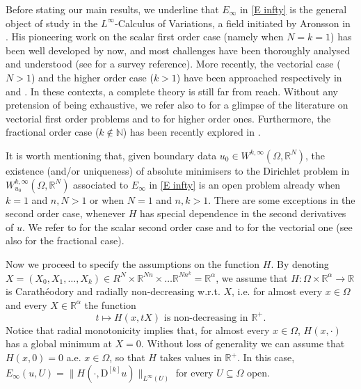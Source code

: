 \documentclass[a4paper,11pt]{article}
\numberwithin{equation}{section}
\newcommand{\numberset}{\mathbb}
\newcommand{\N}{\numberset{N}}
\newcommand{\Om}{\Omega}
\newcommand{\R}{\numberset{R}}
\theoremstyle{definition}
\begin{document}
Before stating our main results, we underline that $E_\infty$ in \eqref{E infty} is the general object of study in the $L^\infty$-Calculus of Variations, a field initiated by Aronsson in \cite{A}. His pioneering work on the scalar first order case (namely when $N=k=1$) has been well developed by now, and most challenges have been thoroughly analysed and understood (see \cite{Kbook} for a survey reference). More recently,  the vectorial case ($N>1$) and the higher order case ($k>1$) have been approached respectively in \cite{K1} and \cite{KM,KP2}. In these contexts, a complete theory is still far from reach. Without any pretension of being exhaustive, we refer also to \cite{K3,K4,KM1} for a glimpse of the literature on vectorial first order problems and to \cite{CKM,DK,KP1,KM2,KM3} for higher order ones. Furthermore, the fractional order case ($k\notin\N$) has been recently explored in \cite{CM}.  

It is worth mentioning that, given boundary data $u_0\in W^{k,\infty}(\Om,\R^N)$, the existence (and/or uniqueness) of absolute minimisers to the Dirichlet problem in $W_{u_0}^{k,\infty}(\Om,\R^N)$ associated to $E_\infty$ in \eqref{E infty} 
 is an open problem already when $k=1$ and $n,N>1$ or when $N=1$ and $n,k>1$. There are some exceptions in the second order case, whenever $H$ has special dependence in the second derivatives of $u$. We refer to \cite{KM, KM3, KP2} for the scalar second order case and to \cite{CKM} for the vectorial one (see also \cite{CM} for the fractional case).

Now we proceed to specify the assumptions on the function $H$. By denoting $X=(X_0,X_1,\ldots,X_k)\in R^N\times \R^{Nn}\times\ldots\R^{Nn^k}=\R^\alpha$, we assume that $H:\Om\times\R^\alpha\to\R$ is Carathéodory and radially non-decreasing w.r.t. $X$, i.e. for almost every $x\in\Om$ and every $X\in\R^\alpha$ the function
$$
t\mapsto H(x,tX) \mbox{ is non-decreasing in }\R^+.
$$
Notice that radial monotonicity implies that, for almost every $x\in\Om$, $H(x,\cdot)$ has a global minimum at $X=0$. Without loss of generality we can assume that $H(x,0)=0$ a.e. $x\in\Om$, so that $H$ takes values in $\R^+$. In this case, $E_\infty(u,U)=\|H(\cdot, \mathrm D^{[k]}u)\|_{L^\infty(U)}$ for every $U\subseteq\Om$ open.
\end{document}
